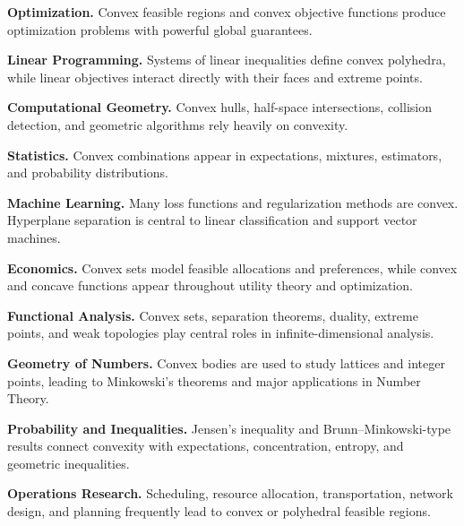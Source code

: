 \begin{applicationbox}
\textbf{Optimization.}
Convex feasible regions and convex objective functions produce optimization
problems with powerful global guarantees.

\medskip

\textbf{Linear Programming.}
Systems of linear inequalities define convex polyhedra, while linear
objectives interact directly with their faces and extreme points.

\medskip

\textbf{Computational Geometry.}
Convex hulls, half-space intersections, collision detection, and geometric
algorithms rely heavily on convexity.

\medskip

\textbf{Statistics.}
Convex combinations appear in expectations, mixtures, estimators, and
probability distributions.

\medskip

\textbf{Machine Learning.}
Many loss functions and regularization methods are convex. Hyperplane
separation is central to linear classification and support vector machines.

\medskip

\textbf{Economics.}
Convex sets model feasible allocations and preferences, while convex and
concave functions appear throughout utility theory and optimization.

\medskip

\textbf{Functional Analysis.}
Convex sets, separation theorems, duality, extreme points, and weak
topologies play central roles in infinite-dimensional analysis.

\medskip

\textbf{Geometry of Numbers.}
Convex bodies are used to study lattices and integer points, leading to
Minkowski's theorems and major applications in Number Theory.

\medskip

\textbf{Probability and Inequalities.}
Jensen's inequality and Brunn--Minkowski-type results connect convexity with
expectations, concentration, entropy, and geometric inequalities.

\medskip

\textbf{Operations Research.}
Scheduling, resource allocation, transportation, network design, and
planning frequently lead to convex or polyhedral feasible regions.
\end{applicationbox}

